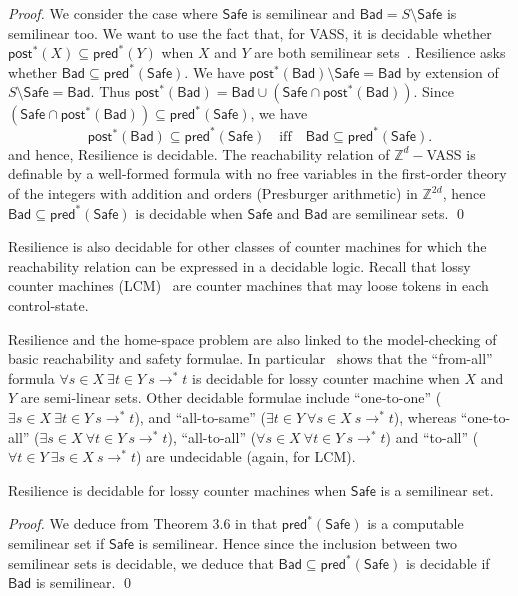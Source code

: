 \documentclass[runningheads]{llncs}
\newcommand{\pred}{\textsf{pred}}
\newcommand{\post}{\textsf{post}}
\newcommand{\Bad}{\textsf{Bad}}
\newcommand{\Safe}{\textsf{Safe}}
\begin{document}
\begin{proof}
We consider the case where $\Safe$ is semilinear
and $\Bad = S \setminus \Safe$ is semilinear too.
We want to use the fact that, for VASS,
it is decidable whether $\post^*(X) \subseteq \pred^*(Y)$ when 
$X$ and $Y$ are both semilinear sets~\cite{DBLP:journals/corr/abs-2207-02697}.
{\sc Resilience} asks whether $\Bad \subseteq \pred^*(\Safe)$.
We have $\post^*(\Bad) \setminus \Safe = \Bad$ by extension of $S \setminus \Safe = \Bad$.
Thus $\post^*(\Bad) = \Bad \cup (\Safe \cap \post^*(\Bad))$. Since $(\Safe \cap \post^*(\Bad)) \subseteq \pred^*(\Safe)$, we have
\[\post^*(\Bad) \subseteq \pred^*(\Safe) \quad \text{iff} \quad \Bad \subseteq \pred^*(\Safe).\]
and hence, {\sc Resilience} is decidable. 
The reachability relation of 
 $\mathbb{Z}^d-$VASS is definable by a well-formed formula with no free variables in the first-order theory of the integers with addition and orders (Presburger arithmetic) in $\mathbb{Z}^{2d}$, hence	$\Bad \subseteq \pred^*(\Safe)$ is decidable when $\Safe$ and $\Bad$ are semilinear sets. \qed
\end{proof}

{\sc Resilience} is also decidable for other classes of counter machines for which the reachability relation can be expressed in a decidable logic. Recall that lossy counter machines (LCM)~\cite{DBLP:conf/rp/Schnoebelen10} are counter machines that may loose tokens in each control-state.

Resilience and the home-space problem are also linked to the 
model-checking of basic reachability and safety formulae. 
In particular~\cite{DBLP:conf/rp/Schnoebelen10} shows that the ``from-all'' formula $\forall s \in X~ \exists t \in Y~ s \to^* t$
is decidable for lossy counter machine
when $X$ and $Y$ are semi-linear sets.
Other decidable formulae include ``one-to-one'' ($\exists s \in  X ~ \exists t \in  Y ~ s \to^* 
 t$), and ``all-to-same'' ($\exists t \in  Y ~ \forall s \in  X ~ s \to^*  t$),
whereas ``one-to-all'' ($\exists s \in  X ~ \forall t \in  Y ~ s \to^*  t$), 
``all-to-all'' ($\forall s \in  X ~ \forall t \in  Y ~ s \to^*  t$)
  and ``to-all'' ($\forall t \in  Y  ~ \exists s \in  X ~ s \to^*  t$) are undecidable (again, for LCM). 

\begin{theorem}\label{SL Lossy}
{\sc Resilience} is decidable for lossy counter machines when $\Safe$  is a semilinear set.
\end{theorem}

\begin{proof}
We deduce from Theorem 3.6 in \cite{DBLP:conf/rp/Schnoebelen10} that $\pred^*(\Safe)$ is a computable semilinear set if $\Safe$ is semilinear. Hence since the inclusion between two semilinear sets is decidable, we deduce that $\Bad \subseteq \pred^*(\Safe)$ is decidable if $\Bad$ is semilinear. \qed
\end{proof}
\end{document}
